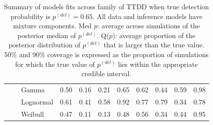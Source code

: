 \documentclass[useAMS,usenatbib,referee,12pt]{article}
\newcommand{\pdet}{p^{(det)}}
\begin{document}
\begin{table}[ht]
\begin{tabular}{l|l|l|cccc|cccc}
\cline{2-11}
& \parbox[t]{2mm}{} & Gamma & 0.50 & 0.16 & 0.21 & 0.65 & 0.62 & 0.44 & 0.59 & 0.98 \\ 
   &  & Lognormal & 0.61 & 0.41 & 0.58 & 0.92 & 0.77 & 0.79 & 0.34 & 0.78 \\ 
   &  & Weibull & 0.47 & 0.11 & 0.13 & 0.48 & 0.56 & 0.34 & 0.44 & 0.95 \\ 
   \hline
\end{tabular}
\caption{Summary of models fits across family of TTDD when true detection probability is $\pdet = 0.65$.
All data and inference models have mixture components.
Med $p$: average across simulations of the posterior median of $\pdet$.  
Q($p$): average proportion of the posterior distribution of $\pdet$ that is larger than the true value.  
50\% and 90\% coverage is expressed as the proportion of simulations for which the true value of $\pdet$ lies within the appropriate credible interval.}
\label{tbl:fam65}
\end{table}
\end{document}
